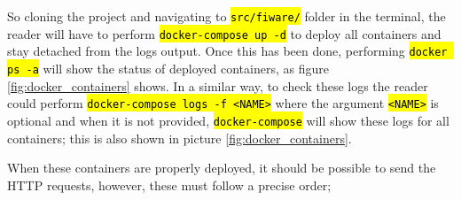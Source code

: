 \documentclass[11pt,a4paper,dvipsnames,twoside]{article}
\newcommand{\cmd}[1] {\hl{\texttt{#1}}}
\begin{document}
So cloning the project and navigating to \cmd{src/fiware/} folder in the terminal, the reader will have to perform \cmd{docker-compose up -d} to deploy all containers and stay detached from the logs output. Once this has been done, performing \cmd{docker ps -a} will show the status of deployed containers, as figure \ref{fig:docker_containers} shows. In a similar way, to check these logs the reader could perform \cmd{docker-compose logs -f <NAME>} where the argument \cmd{<NAME>} is optional and when it is not provided, \cmd{docker-compose} will show these logs for all containers; this is also shown in picture \ref{fig:docker_containers}.

When these containers are properly deployed, it should be possible to send the HTTP requests, however, these must follow a precise order; 
\end{document}

